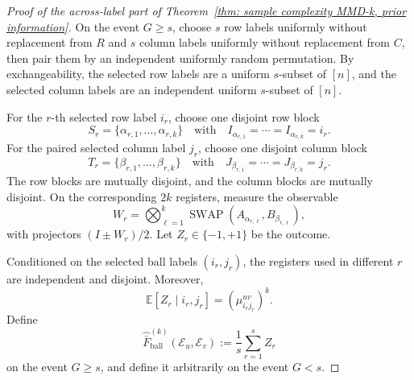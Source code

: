 \documentclass[aps,prx,reprint,superscriptaddress,amsmath,amssymb,longbibliography,floatfix]{revtex4-2}
\newcommand{\dsE}{\mathbb{E}}
\newcommand{\scE}{\mathcal{E}}
\theoremstyle{plain}
\theoremstyle{definition}
\theoremstyle{remark}
\begin{document}
\begin{proof}[Proof of the across-label part of Theorem~\ref{thm: sample complexity MMD-k, prior information}]
    On the event $G\ge s$, choose $s$ row labels uniformly without replacement from $R$ and $s$ column labels uniformly without replacement from $C$, then pair them by an independent uniformly random permutation. By exchangeability, the selected row labels are a uniform $s$-subset of $[n]$, and the selected column labels are an independent uniform $s$-subset of $[n]$.

    For the $r$-th selected row label $i_r$, choose one disjoint row block
    \[
        S_r=\{\alpha_{r,1},\ldots,\alpha_{r,k}\}
        \quad\text{with}\quad
        I_{\alpha_{r,1}}=\cdots=I_{\alpha_{r,k}}=i_r.
    \]
    For the paired selected column label $j_r$, choose one disjoint column block
    \[
        T_r=\{\beta_{r,1},\ldots,\beta_{r,k}\}
        \quad\text{with}\quad
        J_{\beta_{r,1}}=\cdots=J_{\beta_{r,k}}=j_r.
    \]
    The row blocks are mutually disjoint, and the column blocks are mutually disjoint. On the corresponding $2k$ registers, measure the observable
    \begin{equation}
        W_r
        =
        \bigotimes_{\ell=1}^k
        \operatorname{SWAP}
        \!\left(
            A_{\alpha_{r,\ell}},
            B_{\beta_{r,\ell}}
        \right),
    \end{equation}
    with projectors $(I\pm W_r)/2$. Let $Z_r\in\{-1,+1\}$ be the outcome.

    Conditioned on the selected ball labels $(i_r,j_r)$, the registers used in different $r$ are independent and disjoint. Moreover,
    \begin{equation}
        \dsE[Z_r\mid i_r,j_r]
        =
        \left(\mu_{i_rj_r}^{uv}\right)^k.
    \end{equation}
    Define
    \begin{equation}
        \widehat{\bar F}^{(k)}_{\mathrm{ball}}(\scE_u,\scE_v)
        :=
        \frac1s\sum_{r=1}^s Z_r
    \end{equation}
    on the event $G\ge s$, and define it arbitrarily on the event $G<s$.


\end{proof}
\end{document}
